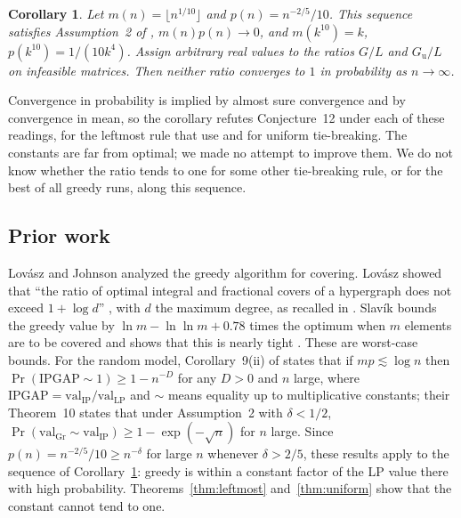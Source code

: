 \documentclass[11pt]{article}
\newtheorem{corollary}[theorem]{Corollary}
\theoremstyle{remark}
\newcommand{\Gu}{G_{\mathrm u}}
\begin{document}
\begin{corollary}\label{cor:conj}
Let $m(n)=\lfloor n^{1/10}\rfloor$ and $p(n)=n^{-2/5}/10$. This sequence
satisfies Assumption~2 of \cite{ADG}, $m(n)p(n)\to0$, and
$m(k^{10})=k$, $p(k^{10})=1/(10k^4)$. Assign arbitrary real values to the
ratios $G/L$ and $\Gu/L$ on infeasible matrices. Then neither ratio
converges to $1$ in probability as $n\to\infty$.
\end{corollary}

Convergence in probability is implied by almost sure convergence and by
convergence in mean, so the corollary refutes Conjecture~12 under each of
these readings, for the leftmost rule that \cite{ADG} use and for uniform
tie-breaking. The constants are far from optimal; we made no attempt to
improve them. We do not know whether the ratio tends to one for some other
tie-breaking rule, or for the best of all greedy runs, along this
sequence.

\subsection{Prior work}
Lov\'asz \cite{Lovasz} and Johnson \cite{Johnson} analyzed the greedy
algorithm for covering. Lov\'asz showed that ``the ratio of optimal integral
and fractional covers of a hypergraph does not exceed $1+\log d$''
\cite[p.~383]{Lovasz}, with $d$ the maximum degree, as recalled in
\cite[p.~30:2]{ADG}. Slav\'ik bounds the greedy value by
$\ln m-\ln\ln m+0.78$ times the optimum when $m$ elements are to be covered
\cite[Theorem~1]{Slavik} and shows that this is nearly tight
\cite[Theorem~2]{Slavik}. These are worst-case bounds. For the
random model, Corollary~9(ii) of \cite{ADG} states that if $mp\lesssim\log
n$ then $\Pr(\mathrm{IPGAP}\sim1)\ge1-n^{-D}$ for any $D>0$ and $n$ large,
where $\mathrm{IPGAP}=\mathrm{val}_{\mathrm{IP}}/\mathrm{val}_{\mathrm{LP}}$
and $\sim$ means equality up to multiplicative constants; their
Theorem~10 states that under Assumption~2 with $\delta<1/2$,
$\Pr(\mathrm{val}_{\mathrm{Gr}}\sim\mathrm{val}_{\mathrm{IP}})\ge
1-\exp(-\sqrt n)$ for $n$ large. Since $p(n)=n^{-2/5}/10\ge n^{-\delta}$
for large $n$ whenever $\delta>2/5$, these results apply to the sequence of
Corollary~\ref{cor:conj}: greedy is within a constant factor of the LP value
there with high probability. Theorems~\ref{thm:leftmost}
and~\ref{thm:uniform} show that the constant cannot tend to one.
\end{document}
